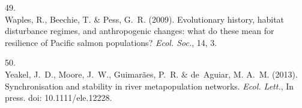 \documentclass[11pt]{article}
\begin{document}
\begin{spacing}{1.6}
\begin{thebibliography}{50}
49.\\
Waples, R., Beechie, T. \& Pess, G.~R. (2009).
\newblock Evolutionary history, habitat disturbance regimes, and anthropogenic
  changes: what do these mean for resilience of {Pacific} salmon populations?
\newblock \emph{Ecol. Soc.}, 14, 3.

50.\\
Yeakel, J.~D., Moore, J.~W., Guimar{\~a}es, P.~R. \& de~Aguiar, M. A.~M.
  (2013).
\newblock Synchronisation and stability in river metapopulation networks.
\newblock \emph{Ecol. Lett.}, In press. doi: 10.1111/ele.12228.

\end{thebibliography}

\end{spacing}
\end{document}
